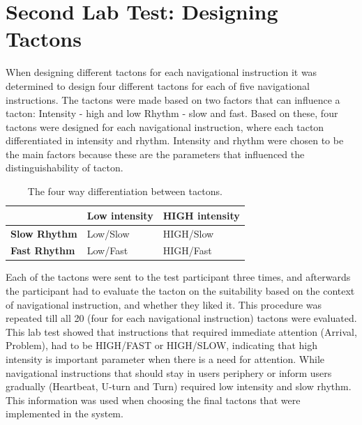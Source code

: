 \documentclass{sigchi}
\begin{document}
\section{Second Lab Test: Designing Tactons}
When designing different tactons for each navigational instruction it was determined to design four different tactons for each of five navigational instructions. The tactons were made based on two factors that can influence a tacton:\newline
Intensity - high and low 
Rhythm - slow and fast.
Based on these, four tactons were designed for each navigational instruction, where each tacton differentiated in intensity and rhythm. Intensity and rhythm were chosen to be the main factors because these are the parameters that influenced the distinguishability of tacton. 
\begin{table}
\centering
\small
\begin{tabular} {p{2.0cm}p{2.0cm}p{2.0cm}}
\toprule
 & \textbf{Low intensity} & \textbf{HIGH intensity}  
\tabularnewline 
\midrule
\textbf{Slow Rhythm} & Low/Slow & HIGH/Slow  
\vspace{0.1cm} \tabularnewline
\textbf{Fast Rhythm} & Low/Fast & HIGH/Fast 
\vspace{0.1cm} 
\tabularnewline
\bottomrule
\end{tabular}
\caption{The four way differentiation between tactons.}
\label{tab:stage_two_tacton_design}
\end{table}
\noindent
\newline
\newline
Each of the tactons were sent to the test participant three times, and afterwards the participant had to evaluate the tacton on the suitability based on the context of navigational instruction, and whether they liked it. This procedure was repeated till all 20 (four for each navigational instruction) tactons were evaluated.
\newline
\newline
This lab test showed that instructions that required immediate attention (Arrival, Problem), had to be HIGH/FAST or HIGH/SLOW, indicating that high intensity is important parameter when there is a need for attention. 
While navigational instructions that should stay in users periphery or inform users gradually (Heartbeat, U-turn and Turn) required low intensity and slow rhythm. This information was used when choosing the final tactons that were implemented in the system.  
\end{document}
